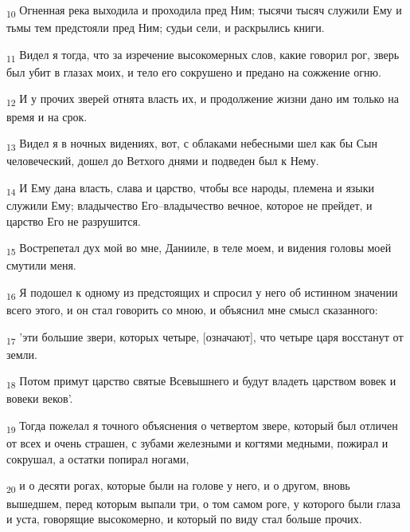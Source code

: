 \begin{tcolorbox}
\textsubscript{10} Огненная река выходила и проходила пред Ним; тысячи тысяч служили Ему и тьмы тем предстояли пред Ним; судьи сели, и раскрылись книги.
\end{tcolorbox}
\begin{tcolorbox}
\textsubscript{11} Видел я тогда, что за изречение высокомерных слов, какие говорил рог, зверь был убит в глазах моих, и тело его сокрушено и предано на сожжение огню.
\end{tcolorbox}
\begin{tcolorbox}
\textsubscript{12} И у прочих зверей отнята власть их, и продолжение жизни дано им только на время и на срок.
\end{tcolorbox}
\begin{tcolorbox}
\textsubscript{13} Видел я в ночных видениях, вот, с облаками небесными шел как бы Сын человеческий, дошел до Ветхого днями и подведен был к Нему.
\end{tcolorbox}
\begin{tcolorbox}
\textsubscript{14} И Ему дана власть, слава и царство, чтобы все народы, племена и языки служили Ему; владычество Его--владычество вечное, которое не прейдет, и царство Его не разрушится.
\end{tcolorbox}
\begin{tcolorbox}
\textsubscript{15} Вострепетал дух мой во мне, Данииле, в теле моем, и видения головы моей смутили меня.
\end{tcolorbox}
\begin{tcolorbox}
\textsubscript{16} Я подошел к одному из предстоящих и спросил у него об истинном значении всего этого, и он стал говорить со мною, и объяснил мне смысл сказанного:
\end{tcolorbox}
\begin{tcolorbox}
\textsubscript{17} 'эти большие звери, которых четыре, [означают], что четыре царя восстанут от земли.
\end{tcolorbox}
\begin{tcolorbox}
\textsubscript{18} Потом примут царство святые Всевышнего и будут владеть царством вовек и вовеки веков'.
\end{tcolorbox}
\begin{tcolorbox}
\textsubscript{19} Тогда пожелал я точного объяснения о четвертом звере, который был отличен от всех и очень страшен, с зубами железными и когтями медными, пожирал и сокрушал, а остатки попирал ногами,
\end{tcolorbox}
\begin{tcolorbox}
\textsubscript{20} и о десяти рогах, которые были на голове у него, и о другом, вновь вышедшем, перед которым выпали три, о том самом роге, у которого были глаза и уста, говорящие высокомерно, и который по виду стал больше прочих.
\end{tcolorbox}
